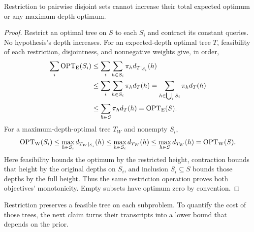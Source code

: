 \begin{claim}
\label{clm:restriction-1}
Restriction to pairwise disjoint sets cannot increase their total expected optimum or any maximum-depth optimum.
\end{claim}
\begin{proof}
Restrict an optimal tree on $S$ to each $S_i$ and contract its constant
queries. No hypothesis's depth increases. For an expected-depth
optimal tree $T$, feasibility of each restriction, disjointness,
and nonnegative weights give, in order,
\[
\begin{aligned}
 \sum_i\operatorname{OPT}_{\mathrm E}(S_i)
 &\le\sum_i\sum_{h\in S_i}\pi_hd_{T|_{S_i}}(h)\\
 &\le\sum_i\sum_{h\in S_i}\pi_hd_T(h)
   =\sum_{h\in\bigcup_iS_i}\pi_hd_T(h)\\
 &\le\sum_{h\in S}\pi_hd_T(h)=\operatorname{OPT}_{\mathrm E}(S).
\end{aligned}
\]
For a maximum-depth-optimal tree $T_W$ and nonempty $S_i$,
\[
 \operatorname{OPT}_{\mathrm W}(S_i)
 \le\max_{h\in S_i}d_{T_W|_{S_i}}(h)
 \le\max_{h\in S_i}d_{T_W}(h)
 \le\max_{h\in S}d_{T_W}(h)=\operatorname{OPT}_{\mathrm W}(S).
\]
Here feasibility bounds the optimum by the restricted height,
contraction bounds that height by the original depths on $S_i$,
and inclusion $S_i\subseteq S$ bounds those depths by the full
height. Thus the same restriction operation proves both objectives'
monotonicity.
Empty subsets have optimum zero by convention.


\end{proof}

Restriction preserves a feasible tree on each subproblem. To quantify
the cost of those trees, the next claim turns their transcripts into a
lower bound that depends on the prior.

